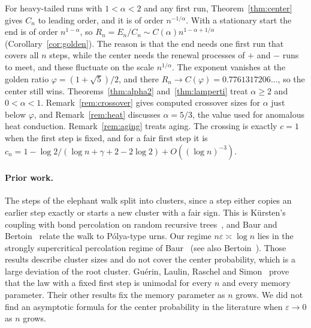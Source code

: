 For heavy-tailed runs with $1<\alpha<2$ and any first run,
Theorem~\ref{thm:center} gives $C_n$ to leading order, and it is of order
$n^{-1/\alpha}$. With a stationary start the end is of order $n^{1-\alpha}$,
so $R_n=E_n/C_n\sim C(\alpha)n^{1-\alpha+1/\alpha}$
(Corollary~\ref{cor:golden}). The reason is that the end needs one first run
that covers all $n$ steps, while the center needs the renewal processes of
$+$ and $-$ runs to meet, and these fluctuate on the scale $n^{1/\alpha}$.
The exponent vanishes at the golden ratio $\varphi=(1+\sqrt5)/2$, and there
$R_n\to C(\varphi)=0.7761317206\ldots$, so the center still wins.
Theorems~\ref{thm:alpha2} and~\ref{thm:lamperti} treat $\alpha\ge2$ and
$0<\alpha<1$. Remark~\ref{rem:crossover} gives computed crossover sizes for
$\alpha$ just below $\varphi$, and Remark~\ref{rem:heat} discusses
$\alpha=5/3$, the value used for anomalous heat conduction.
Remark~\ref{rem:aging} treats aging. The crossing is exactly $c=1$ when the
first step is fixed, and for a fair first step it is
$c_n=1-\log2/(\log n+\gamma+2-2\log2)+O((\log n)^{-3})$.

\paragraph{Prior work.}
The steps of the elephant walk split into clusters, since a step either
copies an earlier step exactly or starts a new cluster with a fair sign. This
is K\"ursten's coupling with bond percolation on random recursive
trees~\cite{kursten2016}, and Baur and Bertoin~\cite{baurbertoin2016} relate
the walk to P\'olya-type urns. Our regime $n\varepsilon\asymp\log n$ lies in
the strongly supercritical percolation regime of Baur~\cite{baur2016} (see
also Bertoin~\cite{bertoin2014}). Those results describe cluster sizes and
do not cover the center probability, which is a large deviation of the root
cluster. Gu\'erin, Laulin, Raschel and
Simon~\cite[proof of Theorem~1.1]{glrs2025} prove that the law with a fixed
first step is unimodal for every $n$ and every memory parameter. Their other
results fix the memory parameter as $n$ grows. We did not find an asymptotic
formula for the center probability in the literature when $\varepsilon\to0$
as $n$ grows.


